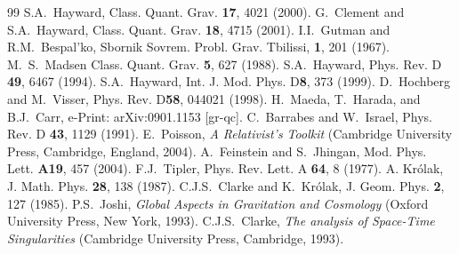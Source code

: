 \documentclass[aps,prd,twocolumn,eqsecnum,showpacs,amsmath]{revtex4}
\begin{document}
\begin{thebibliography}{99}
S.A.~Hayward, 
Class. Quant. Grav. {\bf 17}, 4021 (2000).
G.~Clement and S.A.~Hayward,
Class. Quant. Grav. {\bf 18}, 4715 (2001).
I.I.~Gutman and R.M.~Bespal'ko,
Sbornik Sovrem. Probl. Grav. Tbilissi, {\bf 1}, 201 (1967).
M.~S.~Madsen
Class. Quant. Grav. {\bf 5}, 627 (1988).
S.A.~Hayward, 
Phys. Rev. D {\bf 49}, 6467 (1994).
S.A.~Hayward,
Int. J. Mod. Phys. D{\bf 8}, 373 (1999).
D.~Hochberg and M.~Visser,
Phys. Rev. D{\bf 58}, 044021 (1998).
H.~Maeda, T.~Harada, and B.J.~Carr,
e-Print: arXiv:0901.1153 [gr-qc]. 
C.~Barrabes and W.~Israel,
Phys. Rev. D {\bf 43}, 1129 (1991). 
E.~Poisson, 
{\it A Relativist's Toolkit}
(Cambridge University Press, Cambridge, England, 2004).
A.~Feinstein and S.~Jhingan,
Mod. Phys. Lett. {\bf A19}, 457 (2004).
F.J.~Tipler, 
Phys. Rev. Lett. A {\bf 64}, 8 (1977).
A. Kr\'{o}lak, 
J. Math. Phys. {\bf 28}, 138 (1987).
C.J.S.~Clarke and K.~Kr\'{o}lak, 
J. Geom. Phys. {\bf 2}, 127 (1985). 
P.S.~Joshi, 
\textit{Global Aspects in Gravitation and Cosmology} (Oxford University Press, New York, 1993).
C.J.S.~Clarke, 
\textit{The analysis of Space-Time Singularities} (Cambridge University Press, Cambridge, 1993).

\end{thebibliography}
\end{document}
